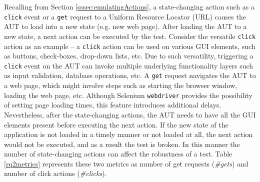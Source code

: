 Recalling from Section \ref{sssec:emulatingActions}, a state-changing action such as a \texttt{click} event or a \texttt{get} request to a Uniform Resource Locator (URL) causes the AUT to load into a new state (e.g. new web page). After loading the AUT to a new state, a next action can be executed by the test. Consider the versatile \texttt{click} action as an example -- a \texttt{click} action can be used on various GUI elements, such as buttons, check-boxes, drop-down lists, etc. Due to such versatility, triggering a \texttt{click} event on the AUT can invoke multiple underlying functionality layers such as input validation, database operations, etc. A \texttt{get} request navigates the AUT to a web page, which might involve steps such as starting the browser window, loading the web page, etc. Although Selenium \texttt{webdriver} provides the possibility of setting page loading times, this feature introduces additional delays. Nevertheless, after the state-changing actions, the AUT needs to have all the GUI elements present before executing the next action. If the new state of the application is not loaded in a timely manner or not loaded at all, the next action would not be executed, and as a result the test is broken. In this manner the number of state-changing actions can affect the robustness of a test. Table \ref{rq2metrics} represents these two metrics as number of get requests (\textit{\#gets}) and number of click actions (\textit{\#clicks}).

